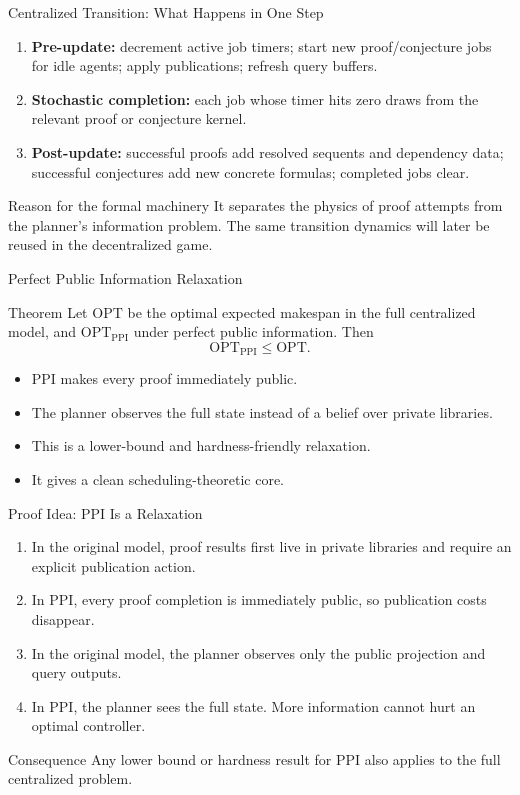 \documentclass[10pt,aspectratio=169]{beamer}
\newcommand{\OPT}{\mathrm{OPT}}
\begin{document}
\begin{frame}{Centralized Transition: What Happens in One Step}
\small
\begin{enumerate}
  \item \textbf{Pre-update:} decrement active job timers; start new proof/conjecture jobs for idle agents; apply publications; refresh query buffers.
  \item \textbf{Stochastic completion:} each job whose timer hits zero draws from the relevant proof or conjecture kernel.
  \item \textbf{Post-update:} successful proofs add resolved sequents and dependency data; successful conjectures add new concrete formulas; completed jobs clear.
\end{enumerate}

\begin{block}{Reason for the formal machinery}
It separates the physics of proof attempts from the planner's information problem. The same transition dynamics will later be reused in the decentralized game.
\end{block}
\end{frame}

\begin{frame}{Perfect Public Information Relaxation}
\small
\begin{block}{Theorem}
Let $\OPT$ be the optimal expected makespan in the full centralized model, and $\OPT_{\mathrm{PPI}}$ under perfect public information. Then
\[
\OPT_{\mathrm{PPI}}\le \OPT.
\]
\end{block}

\begin{itemize}
  \item PPI makes every proof immediately public.
  \item The planner observes the full state instead of a belief over private libraries.
  \item This is a lower-bound and hardness-friendly relaxation.
  \item It gives a clean scheduling-theoretic core.
\end{itemize}
\end{frame}

\begin{frame}{Proof Idea: PPI Is a Relaxation}
\small
\begin{enumerate}
  \item In the original model, proof results first live in private libraries and require an explicit publication action.
  \item In PPI, every proof completion is immediately public, so publication costs disappear.
  \item In the original model, the planner observes only the public projection and query outputs.
  \item In PPI, the planner sees the full state. More information cannot hurt an optimal controller.
\end{enumerate}

\begin{block}{Consequence}
Any lower bound or hardness result for PPI also applies to the full centralized problem.
\end{block}
\end{frame}
\end{document}
